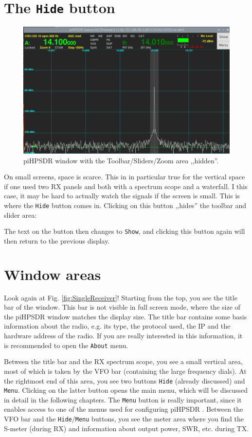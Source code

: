 \documentclass[12pt]{book}
\def\rett#1{\texttt{\color{red}#1}}
\def\bltt#1{\texttt{\color{blue}#1}}
\def\pH{pi\-HPSDR }
\begin{document}
\section{The \texttt{Hide} button}
\begin{figure}[ht]
\center
\includegraphics[width=12cm]{Hidden.png}
\caption{\pH window with the Toolbar/Sliders/Zoom
area ,,hidden''.}
\end{figure}

On small screens, space is scarce. This in in particular true
for the vertical space if one used two RX panels and both
with a spectrum scope and a waterfall. I this case, it may be
hard to actually watch the signals if the screen is small.
This is where the \rett{Hide} button comes in. Clicking on
this button ,,hides'' the toolbar and slider area:


The text on the button then changes to \rett{Show}, and
clicking this button again will then return to the
previous display.

\section{Window areas}

Look again at Fig. \ref{fig:SingleReceiver}! Starting from the
top, you see the title bar of the window. This bar is not visible
in full screen mode, where the size of the \pH window matches
the display size. The title bar contains some basis information
about the radio, e.g.  its type, the protocol used, the  IP
and the hardware address of the radio. If you are really interested
in this information, it is recommended to open the
\bltt{About} menu.

Between the title bar and the RX spectrum scope, you see
a small vertical area, most of  which is taken by the VFO bar
(containing the large frequency dials). At the rightmost
end of this area, you see two buttons \rett{Hide} (already
discussed) and \rett{Menu}. Clicking on the latter button opens
the main menu, which will be discussed in detail in the following
chapters. The \rett{Menu} button is really important, since it
enables access to one of the menus used for configuring \pH.
Between the VFO bar and the \rett{Hide}/\rett{Menu} buttons,
you see the meter area where you find the S-meter (during RX)
and information about output power, SWR, etc. during TX.
\end{document}
